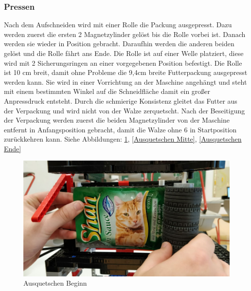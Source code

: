 \subsubsection{Pressen}

Nach dem Aufschneiden wird mit einer Rolle die Packung ausgepresst. Dazu werden zuerst die ersten 2 Magnetzylinder gelöst bis die Rolle vorbei ist. Danach werden sie wieder in Position gebracht. Daraufhin werden die anderen beiden gelöst und die Rolle fährt ans Ende. Die Rolle ist auf einer Welle platziert, diese wird mit 2 Sicherungsringen an einer  vorgegebenen Position befestigt. Die Rolle ist 10 cm breit, damit ohne Probleme die 9,4cm breite Futterpackung ausgepresst werden kann. Sie wird in einer Vorrichtung an der Maschine angehängt und steht mit einem bestimmten Winkel auf die Schneidfläche damit ein großer Anpressdruck entsteht. Durch die schmierige Konsistenz gleitet das Futter aus der Verpackung und wird nicht von der Walze zerquetscht. Nach der Beseitigung der Verpackung werden zuerst die beiden Magnetzylinder von der Maschine entfernt in Anfangsposition gebracht, damit die Walze ohne 6 in Startposition zurückkehren kann. Siehe Abbildungen: \ref{Ausquetschen Beginn}, \ref{Ausquetschen Mitte}, \ref{Ausquetschen Ende}

\begin{figure}[H]
\begin{center}
\includegraphics[width=13cm]{Bilder/Ablauf_1_png/Ausquetschen_1}
\caption{Ausquetschen Beginn}
\label{Ausquetschen Beginn}
\end{center}
\end{figure}

